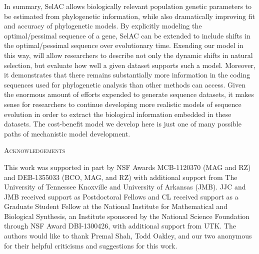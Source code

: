 \documentclass[12pt,letterpaper,fleqn]{article}
\renewcommand{\section}[1]{%
\bigskip
\begin{center}
\begin{Large}
\normalfont\scshape #1
\medskip
\end{Large}
\end{center}}
\newcommand{\PC}{physicochemical\xspace}
\newcommand{\selac}{SelAC\xspace}
\begin{document}

 

In summary, \selac allows biologically relevant population genetic parameters to be estimated from phylogenetic information, while also dramatically improving fit and accuracy of phylogenetic models. 
By explicitly modeling the optimal/pessimal sequence of a gene, \selac can be extended to include shifts in the optimal/pessimal sequence over evolutionary time.
Exending our model in this way, will allow researchers to describe not only the dynamic shifts in natural selection, but evaluate how well a given dataset supports such a model.
Moreover, it demonstrates that there remains substantially more information in the coding sequences used for phylogenetic analysis than other methods can access. 
Given the enormous amount of efforts expended to generate sequence datasets, it makes sense for researchers to continue developing more realistic models of sequence evolution in order to extract the biological information embedded in these datasets. 
The cost-benefit model we develop here is just one of many possible paths of mechanistic model development.






\section{Acknowledgements}
This work was supported in part by NSF Awards MCB-1120370 (MAG and RZ) and DEB-1355033 (BCO, MAG, and RZ) with additional support from The University of Tennessee Knoxville and University of Arkansas (JMB).
JJC and JMB received support as Postdoctoral Fellows and CL received support as a Graduate Student Fellow at the National Institute for Mathematical and Biological Synthesis, an Institute sponsored by the National Science Foundation through NSF Award DBI-1300426, with additional support from UTK.
The authors would like to thank Premal Shah, Todd Oakley, and our two anonymous  for their helpful criticisms and suggestions for this work.
\clearpage
\end{document}
